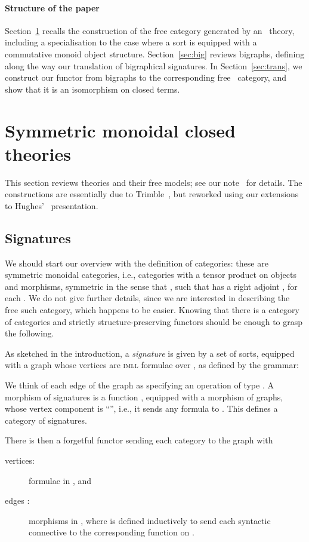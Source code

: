\documentclass{llncs}
\newcommand{\imll}{\textsc{imll}}
\begin{document}
\paragraph{Structure of the paper}
Section~\ref{sec:smctheories} recalls the construction of the free
\smc{} category generated by an \smc\ theory, including a
specialisation to the case where a sort is equipped with a commutative
monoid object structure.  Section~\ref{sec:big} reviews bigraphs,
defining along the way our translation of bigraphical signatures. In
Section~\ref{sec:trans}, we construct our functor from bigraphs to the
corresponding free \smc\ category, and show that it is an isomorphism
on closed terms.


\section{Symmetric monoidal closed theories}\label{sec:smctheories}
This section reviews \smc{} theories and their free models; see our
note~\cite{GHP} for details. The constructions are essentially due to
Trimble~\cite{Trimble:phd}, but reworked using our extensions to
Hughes'~\cite{Hughes:freestar} presentation.

\subsection{Signatures}
We should start our overview with the definition of \smc{} categories:
these are symmetric monoidal categories, i.e., categories with a
tensor product  on objects and morphisms, symmetric in the
sense that , such that  has a
right adjoint , for each . We do not give further
details, since we are interested in describing the free such category,
which happens to be easier. Knowing that there is a category 
of \smc{} categories and strictly structure-preserving functors should
be enough to grasp the following.

As sketched in the introduction, a \emph{signature}  is given
by a set  of sorts, equipped with a graph whose vertices are
\imll{} formulae over , as defined by the grammar:

We think of each edge  of the graph as specifying an operation 
of type .
A morphism of signatures  is a 
function , equipped with a morphism of graphs, whose 
vertex component is ``'', i.e., it sends 
any formula  to .
This defines a category  of signatures.

There is then a forgetful functor  sending
each \smc{} category  to the graph with
\begin{description}
\item[vertices:] formulae in , and
\item[edges :] morphisms  in ,
  where  is defined inductively to send each syntactic
  connective to the corresponding function on .
\end{description}
\end{document}
